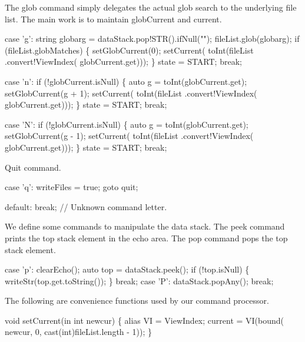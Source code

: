 \nwendcode{}The glob command simply delegates the actual glob search to the
underlying file list. The main work is to maintain {\Tt{}globCurrent\nwendquote} and
{\Tt{}current\nwendquote}.

\nwenddocs{}\plusendmoddef\nwstartdeflinemarkup\nwenddeflinemarkup
case 'g':
  string globarg = dataStack.pop!STR().ifNull("");
  fileList.glob(globarg);
  if (fileList.globMatches) \{
    setGlobCurrent(0);
    setCurrent(
      toInt(fileList
            .convert!ViewIndex(
              globCurrent.get)));
  \}
  state = START;
  break;

case 'n':
  if (!globCurrent.isNull) \{
    auto g = toInt(globCurrent.get);
    setGlobCurrent(g + 1);
    setCurrent(
      toInt(fileList
            .convert!ViewIndex(
              globCurrent.get)));
  \}
  state = START;
  break;

case 'N':
  if (!globCurrent.isNull) \{
    auto g = toInt(globCurrent.get);
    setGlobCurrent(g - 1);
    setCurrent(
      toInt(fileList
            .convert!ViewIndex(
              globCurrent.get)));
  \}
  state = START;
  break;

\nwendcode{}Quit command.

\nwenddocs{}\plusendmoddef\nwstartdeflinemarkup\nwenddeflinemarkup
case 'q':
  writeFiles = true;
  goto quit;

\nwendcode{}\plusendmoddef\nwstartdeflinemarkup\nwenddeflinemarkup
default: break; // Unknown command letter.

\nwendcode{}We define some commands to manipulate the data stack. The peek
command prints the top stack element in the echo area. The pop command
pops the top stack element.

\nwenddocs{}\plusendmoddef\nwstartdeflinemarkup\nwenddeflinemarkup
case 'p':
  clearEcho();
  auto top = dataStack.peek();
  if (!top.isNull) \{
    writeStr(top.get.toString());
  \}
  break;
case 'P':
  dataStack.popAny();
  break;

\nwendcode{}The following are convenience functions used by our command
processor.

\nwenddocs{}\endmoddef\nwstartdeflinemarkup\nwenddeflinemarkup
void setCurrent(in int newcur)
\{
  alias VI = ViewIndex;
  current = VI(bound(
                 newcur,
                 0,
                 cast(int)fileList.length - 1));
\}

